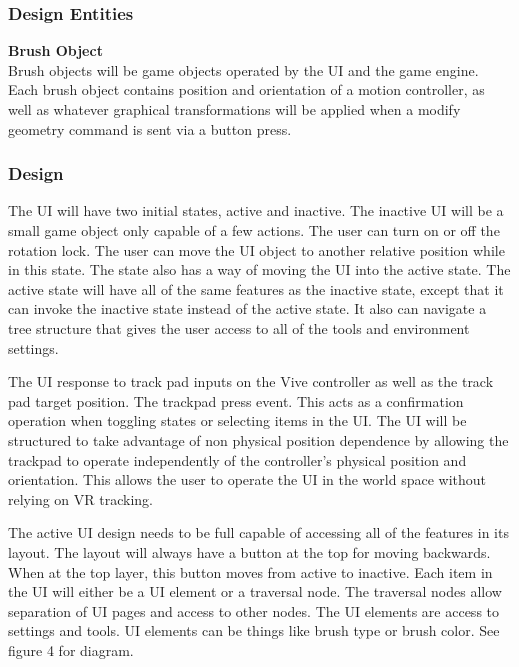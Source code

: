 \documentclass[onecolumn, draftclsnofoot,10pt, compsoc]{IEEEtran}
\begin{document}
\subsubsection{Design Entities}
\textbf{Brush Object} \\
Brush objects will be game objects operated by the UI and the game engine. Each brush object contains position and orientation of a motion controller, as well as whatever graphical transformations will be applied when a modify geometry command is sent via a button press.

\subsubsection{Design}
The UI will have two initial states, active and inactive. The inactive UI will be a small game object only capable of a few actions. The user can turn on or off the rotation lock. The user can move the UI object to another relative position while in this state. The state also has a way of moving the UI into the active state. 
The active state will have all of the same features as the inactive state, except that it can invoke the inactive state instead of the active state. It also can navigate a tree structure that gives the user access to all of the tools and environment settings. 

The UI response to track pad inputs on the Vive controller as well as the track pad target position. The trackpad press event. This acts as a confirmation operation when toggling states or selecting items in the UI. The UI will be structured to take advantage of non physical position dependence by allowing the trackpad to operate independently of the controller's physical position and orientation. This allows the user to operate the UI in the world space without relying on VR tracking.

The active UI design needs to be full capable of accessing all of the features in its layout. The layout will always have a button at the top for moving backwards. When at the top layer, this button moves from active to inactive. Each item in the UI will either be a UI element or a traversal node. The traversal nodes allow separation of UI pages and access to other nodes. The UI elements are access to settings and tools. UI elements can be things like brush type or brush color. See figure 4 for diagram.
\end{document}
